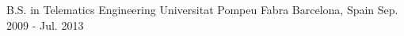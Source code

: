 

\begin{cventries}

  \cventry
    {B.S. in Telematics Engineering} %
    {Universitat Pompeu Fabra} %
    {Barcelona, Spain} %
    {Sep. 2009 - Jul. 2013} %
    {
    }

\end{cventries}
